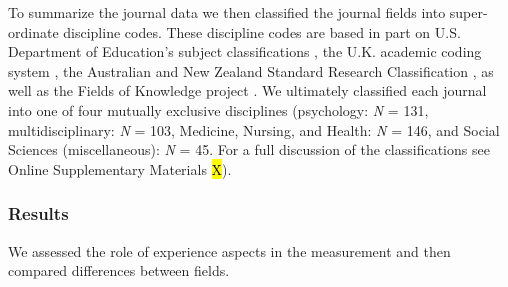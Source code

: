 To summarize the journal data we then classified the journal fields into
super-ordinate discipline codes. These discipline codes are based in
part on U.S. Department of Education's subject classifications
\citep[i.e., CIP;][]{InstituteofEducationSciences2020}, the U.K.
academic coding system
\citep[JACS 3.0;][]{HigherEducationStatisticsAgency2013}, the Australian
and New Zealand Standard Research Classification
\citep[ANZSRC 2020;][]{AustralianBureauofStatistics2020}, as well as the
Fields of Knowledge project \citep{ThingsmadeThinkable2014}. We
ultimately classified each journal into one of four mutually exclusive
disciplines (psychology: \textit{N} = 131, multidisciplinary: \textit{N}
= 103, Medicine, Nursing, and Health: \textit{N} = 146, and Social
Sciences (miscellaneous): \textit{N} = 45. For a full discussion of the
classifications see Online Supplementary Materials \hl{X}).

\subsubsection{Results}

We assessed the role of experience aspects in the measurement and then
compared differences between fields.

